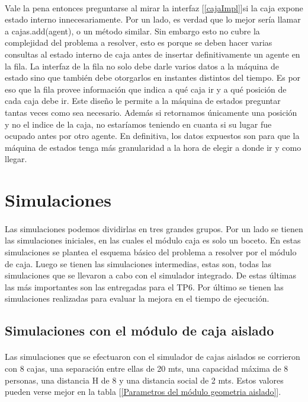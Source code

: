 \documentclass{article}
\begin{document}
\paragraph{}
Vale la pena entonces preguntarse al mirar la interfaz [\ref{cajaImpl}]si la caja expone estado interno innecesariamente. Por un lado, es verdad que lo mejor sería llamar a cajas.add(agent), o un método similar. Sin embargo esto no cubre la complejidad del problema a resolver, esto es porque se deben hacer varias consultas al estado interno de caja antes de insertar definitivamente un agente en la fila. La interfaz de la fila no solo debe darle varios datos a la máquina de estado sino que también debe otorgarlos en instantes distintos del tiempo. Es por eso que la fila provee información que indica a qué caja ir y a qué posición de cada caja debe ir. Este diseño le permite a la máquina de estados preguntar tantas veces como sea necesario. Además si retornamos únicamente una posición y no el indice de la caja, no estaríamos teniendo en cuanta si su lugar fue ocupado antes por otro agente. En definitiva, los datos expuestos son para que la máquina de estados tenga más granularidad a la hora de elegir a donde ir y como llegar.

\section{Simulaciones}

\paragraph{}
Las simulaciones podemos dividirlas en tres grandes grupos. Por un lado se tienen las simulaciones iniciales, en las cuales el módulo caja es solo un boceto. En estas simulaciones se plantea el esquema básico del problema a resolver por el módulo de caja. Luego se tienen las simulaciones intermedias, estas son, todas las simulaciones que se llevaron a cabo con el simulador integrado. De estas últimas las más importantes son las entregadas para el TP6. Por último se tienen las simulaciones realizadas para evaluar la mejora en el tiempo de ejecución.

\subsection{Simulaciones con el módulo de caja aislado}

\paragraph{}
Las simulaciones que se efectuaron con el simulador de cajas aislados se corrieron con 8 cajas, una separación entre ellas de 20 mts, una capacidad máxima de 8 personas, una distancia H de 8 y una distancia social de 2 mts. Estos valores pueden verse mejor en la tabla [\ref{Parametros del módulo geometria aislado}].
\end{document}
